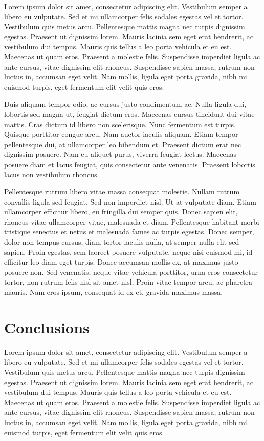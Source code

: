 \documentclass{acm_proc_article-sp}
\begin{document}
Lorem ipsum dolor sit amet, consectetur adipiscing elit. Vestibulum semper a libero eu vulputate. Sed et mi ullamcorper felis sodales egestas vel et tortor. Vestibulum quis metus arcu. Pellentesque mattis magna nec turpis dignissim egestas. Praesent ut dignissim lorem. Mauris lacinia sem eget erat hendrerit, ac vestibulum dui tempus. Mauris quis tellus a leo porta vehicula et eu est. Maecenas ut quam eros. Praesent a molestie felis. Suspendisse imperdiet ligula ac ante cursus, vitae dignissim elit rhoncus. Suspendisse sapien massa, rutrum non luctus in, accumsan eget velit. Nam mollis, ligula eget porta gravida, nibh mi euismod turpis, eget fermentum elit velit quis eros.

Duis aliquam tempor odio, ac cursus justo condimentum ac. Nulla ligula dui, lobortis sed magna ut, feugiat dictum eros. Maecenas cursus tincidunt dui vitae mattis. Cras dictum id libero non scelerisque. Nunc fermentum est turpis. Quisque porttitor congue arcu. Nam auctor iaculis aliquam. Etiam tempor pellentesque dui, at ullamcorper leo bibendum et. Praesent dictum erat nec dignissim posuere. Nam eu aliquet purus, viverra feugiat lectus. Maecenas posuere diam et lacus feugiat, quis consectetur ante venenatis. Praesent lobortis lacus non vestibulum rhoncus.

Pellentesque rutrum libero vitae massa consequat molestie. Nullam rutrum convallis ligula sed feugiat. Sed non imperdiet nisl. Ut at vulputate diam. Etiam ullamcorper efficitur libero, eu fringilla dui semper quis. Donec sapien elit, rhoncus vitae ullamcorper vitae, malesuada et diam. Pellentesque habitant morbi tristique senectus et netus et malesuada fames ac turpis egestas. Donec semper, dolor non tempus cursus, diam tortor iaculis nulla, at semper nulla elit sed sapien. Proin egestas, sem laoreet posuere vulputate, neque nisi euismod mi, id efficitur leo diam eget turpis. Donec accumsan mollis ex, at maximus justo posuere non. Sed venenatis, neque vitae vehicula porttitor, urna eros consectetur tortor, non rutrum felis nisl sit amet nisl. Proin vitae tempor arcu, ac pharetra mauris. Nam eros ipsum, consequat id ex et, gravida maximus massa.

\section{Conclusions}

Lorem ipsum dolor sit amet, consectetur adipiscing elit. Vestibulum semper a libero eu vulputate. Sed et mi ullamcorper felis sodales egestas vel et tortor. Vestibulum quis metus arcu. Pellentesque mattis magna nec turpis dignissim egestas. Praesent ut dignissim lorem. Mauris lacinia sem eget erat hendrerit, ac vestibulum dui tempus. Mauris quis tellus a leo porta vehicula et eu est. Maecenas ut quam eros. Praesent a molestie felis. Suspendisse imperdiet ligula ac ante cursus, vitae dignissim elit rhoncus. Suspendisse sapien massa, rutrum non luctus in, accumsan eget velit. Nam mollis, ligula eget porta gravida, nibh mi euismod turpis, eget fermentum elit velit quis eros.




\end{document}
